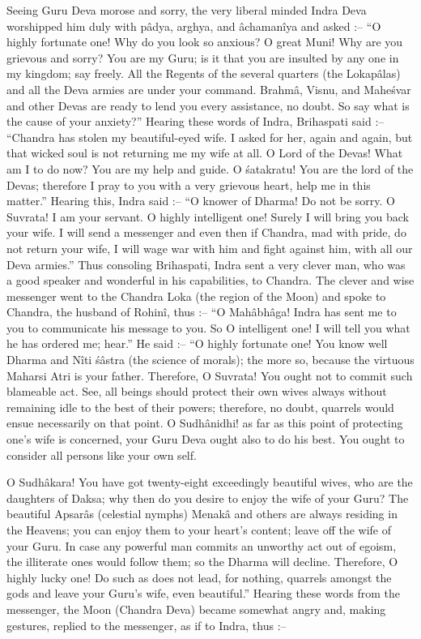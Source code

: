 Seeing Guru Deva morose and sorry, the very liberal minded Indra Deva worshipped him duly with p\^adya, arghya, and \^achaman\^iya and asked :-- ``O highly fortunate one! Why do you look so anxious? O great Muni! Why are you grievous and sorry? You are my Guru; is it that you are insulted by any one in my kingdom; say freely. All the Regents of the several quarters (the Lokap\^alas) and all the Deva armies are under your command. Brahm\^a, Visnu, and Mahe\'svar and other Devas are ready to lend you every assistance, no doubt. So say what is the cause of your anxiety?'' Hearing these words of Indra, Brihaspati said :-- ``Chandra has stolen my beautiful-eyed wife. I asked for her, again and again, but that wicked soul is not returning me my wife at all. O Lord of the Devas! What am I to do now? You are my help and guide. O \'satakratu! You are the lord of the Devas; therefore I pray to you with a very grievous heart, help me in this matter.'' Hearing this, Indra said :-- ``O knower of Dharma! Do not be sorry. O Suvrata! I am your servant. O highly intelligent one! Surely I will bring you back your wife. I will send a messenger and even then if Chandra, mad with pride, do not return your wife, I will wage war with him and fight against him, with all our Deva armies.'' Thus consoling Brihaspati, Indra sent a very clever man, who was a good speaker and wonderful in his capabilities, to Chandra. The clever and wise messenger went to the Chandra Loka (the region of the Moon) and spoke to Chandra, the husband of Rohin\^i, thus :-- ``O Mah\^abh\^aga! Indra has sent me to you to communicate his message to you. So O intelligent one! I will tell you what he has ordered me; hear.'' He said :-- ``O highly fortunate one! You know well Dharma and N\^iti \'s\^astra (the science of morals); the more so, because the virtuous Maharsi Atri is your father. Therefore, O Suvrata! You ought not to commit such blameable act. See, all beings should protect their own wives always without remaining idle to the best of their powers; therefore, no doubt, quarrels would ensue necessarily on that point. O Sudh\^anidhi! as far as this point of protecting one's wife is concerned, your Guru Deva ought also to do his best. You ought to consider all persons like your own self.

O Sudh\^akara! You have got twenty-eight exceedingly beautiful wives, who are the daughters of Daksa; why then do you desire to enjoy the wife of your Guru? The beautiful Apsar\^as (celestial nymphs) Menak\^a and others are always residing in the Heavens; you can enjoy them to your heart's content; leave off the wife of your Guru. In case any powerful man commits an unworthy act out of egoism, the illiterate ones would follow them; so the Dharma will decline. Therefore, O highly lucky one! Do such as does not lead, for nothing, quarrels amongst the gods and leave your Guru's wife, even beautiful.'' Hearing these words from the messenger, the Moon (Chandra Deva) became somewhat angry and, making gestures, replied to the messenger, as if to Indra, thus :--

